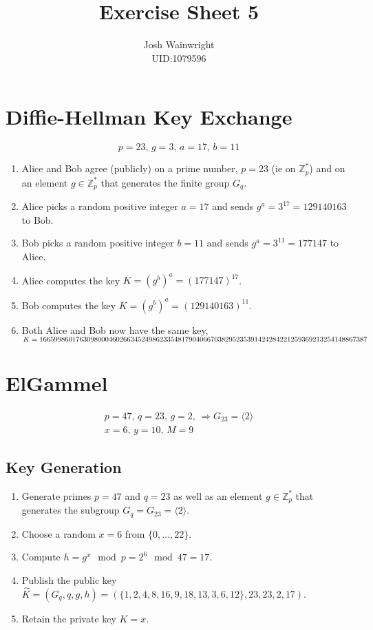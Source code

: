 \documentclass[11pt]{article} %
\author{Josh Wainwright \\ UID:1079596}
\title{Exercise Sheet 5 }
\date{}
\begin{document}
\maketitle

\section{Diffie-Hellman Key Exchange}
\begin{equation}
	p=23,\, g=3,\, a=17,\, b=11
\end{equation}
\begin{enumerate}
	\item Alice and Bob agree (publicly) on a prime number, $p=23$ (ie on
		$\mathbb{Z}^{*}_{p}$) and on an element $g \in \mathbb{Z}^{*}_{p}$ that
		generates the finite group  $G_q$.
	\item Alice picks a random positive integer $a=17$ and sends $g^a = 3^{17}
		= 129140163$ to Bob.
	\item Bob picks a random positive integer $b=11$ and sends $g^a = 3^{11} =
		177147$ to Alice.
	\item Alice computes the key $K = {(g^b)}^a = {(177147)}^{17}$.
	\item Bob computes the key $K = {(g^b)}^a = {(129140163)}^{11}$.
	\item Both Alice and Bob now have the same key, $K =
		1\-6\-6\-5\-9\-9\-8\-6\-0\-1\-7\-6\-3\-0\-9\-8\-0\-0\-0\-4\-6\-0\-2\-6\-6\-3\-4\-5\-2\-4\-9\-8\-6\-2\-3\-3\-5\-4\-8\-1\-7\-9\-0\-4\-0\-6\-6\-7\-0\-3\-8\-2\-9\-5\-2\-3\-5\-3\-9\-1\-4\-2\-4\-2\-8\-4\-2\-2\-1\-2\-5\-9\-3\-6\-9\-2\-1\-3\-2\-5\-4\-1\-4\-8\-8\-6\-7\-3\-8\-7$
\end{enumerate}

\section{ElGammel}
\begin{align}
	p=47,\, q=23,\, g=2,\, \Rightarrow G_{23} = \langle 2 \rangle \\
	x=6,\, y=10,\, M=9
\end{align}
\subsection{Key Generation}
\begin{enumerate}
	\item Generate primes $p=47$ and $q=23$ as well as an element $g \in
		\mathbb{Z}^{*}_{p}$ that generates the subgroup $G_{q} = G_{23} =
		\langle 2 \rangle$.
	\item Choose a random $x=6$ from $\{0, \ldots, 22\}$.
	\item Compute $h=g^x \mod p = 2^6 \mod 47 = 17$.
	\item Publish the public key $\hat{K} = (G_q, q, g, h) =
		(\{1,2,4,8,16,9,18, 13, 3, 6, 12\}, 23, 23, 2, 17)$.
	\item Retain the private key $K=x$.
\end{enumerate}
\end{document}
